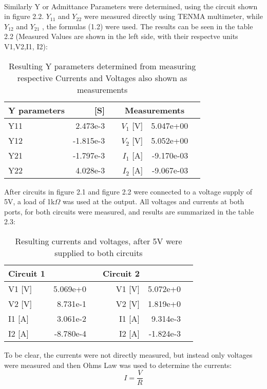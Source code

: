 \documentclass[12pt]{report}
\begin{document}
\\
Similarly Y or Admittance Parameters were determined, using the circuit shown in figure 2.2.  $Y_{11}$  and  $Y_{22}$ were measured directly using TENMA multimeter, while  $Y_{12}$ and  $Y_{21}$ , the formulas (1.2) were used. The results can be seen in the table 2.2 (Measured Values are shown in the left side, with their respectve units V1,V2,I1, I2): 
\begin{table}[!htp]\centering
\large
\begin{tabular}{lrrrrr}\toprule
Y parameters & [S] & &\multicolumn{2}{c}{Measurements } \\\midrule
Y11 &2.473e-3  & &$V_1$ [V] & 5.047e+00\\
Y12 &-1.815e-3 & &$V_2$ [V] & 5.052e+00 \\
Y21 &-1.797e-3 & & $I_1$ [A] & -9.170e-03 \\
Y22 &4.028e-3  & & $I_2$ [A] & -9.067e-03 \\
\bottomrule
\end{tabular}
\caption{Resulting Y parameters determined from measuring respective Currents and Voltages also shown as measurements}
\label{tab: }
\end{table}
\newpage
After circuits in figure 2.1 and figure 2.2 were connected to a voltage supply of 5V, a load of 1k$\Omega$ was used at the output. All voltages and currents at both ports, for both circuits were measured, and results are summarized in the table 2.3:

\begin{table}[!htp]\centering
\large
\begin{tabular}{lrrrrr}\toprule
Circuit 1 & & &Circuit 2 & \\\midrule
V1 [V] &5.069e+0 & &V1 [V] &5.072e+0 \\
V2 [V] &8.731e-1 & &V2 [V] &1.819e+0 \\
I1 [A] &3.061e-2 & &I1 [A] &9.314e-3 \\
I2 [A] &-8.780e-4 & &I2 [A] &-1.824e-3 \\
\bottomrule
\end{tabular}
\caption{Resulting currents and voltages, after 5V were supplied to both circuits }
\label{tab: }
\end{table}

To be clear, the currents were not directly measured, but instead only voltages were measured and then Ohms Law was used to determine the currents:
$$ I = \frac{V}{R} $$
\newpage
\end{document}
